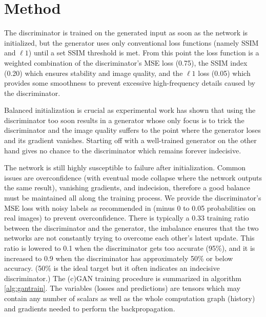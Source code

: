 \section{Method}
The discriminator is trained on the generated input as soon as the network is initialized, but the generator uses only conventional loss functions (namely \ac{SSIM} and $\ell 1$) until a set \ac{SSIM} threshold is met. From this point the loss function is a weighted combination of the discriminator's \ac{MSE} loss (0.75), the \ac{SSIM} index (0.20) which ensures stability and image quality, and the $\ell 1$ loss (0.05) which provides some smoothness to prevent excessive high-frequency details caused by the discriminator. 

Balanced initialization is crucial as experimental work has shown that using the discriminator too soon results in a generator whose only focus is to trick the discriminator and the image quality suffers to the point where the generator loses and its gradient vanishes. Starting off with a well-trained generator on the other hand gives no chance to the discriminator which remains forever indecisive.

The network is still highly susceptible to failure after initialization. Common issues are overconfidence (with eventual mode collapse where the network outputs the same result), vanishing gradients, and indecision, therefore a good balance must be maintained all along the training process. We provide the discriminator's \ac{MSE} loss with noisy labels as recommended in \cite{gantechniques}\cite{gantutorial} (minus 0 to 0.05 probabilities on real images) to prevent overconfidence. There is typically a 0.33 training ratio between the discriminator and the generator, the imbalance ensures that the two networks are not constantly trying to overcome each other's latest update. This ratio is lowered to 0.1 when the discriminator gets too accurate (95\%), and it is increased to 0.9 when the discriminator has approximately 50\% or below accuracy. (50\% is the ideal target but it often indicates an indecisive discriminator.)
The (c)GAN training procedure is summarized in algorithm \ref{alg:gantrain}. The variables (losses and predictions) are tensors which may contain any number of scalars as well as the whole computation graph (history) and gradients needed to perform the backpropagation.


